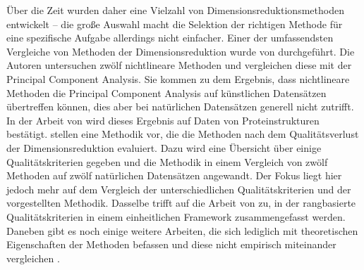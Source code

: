 Über die Zeit wurden daher eine Vielzahl von Dimensionsreduktionsmethoden entwickelt \parencite[siehe z.B.][]{Lee.2007} -- die große Auswahl macht die Selektion der richtigen Methode für
eine spezifische Aufgabe allerdings nicht einfacher. Einer der umfassendsten Vergleiche von
Methoden der Dimensionsreduktion wurde von \Textcite{vanderMaaten.2009} durchgeführt. Die Autoren
untersuchen zwölf nichtlineare Methoden und vergleichen diese mit der Principal Component Analysis.
Sie kommen zu dem Ergebnis, dass nichtlineare Methoden die Principal Component Analysis auf
künstlichen Datensätzen übertreffen können, dies aber bei natürlichen Datensätzen generell nicht
zutrifft. In der Arbeit von \textcite{RohanPandit.2016} wird dieses Ergebnis auf Daten von
Proteinstrukturen bestätigt. \Textcite{Gracia.2014} stellen eine Methodik vor, die die Methoden
nach dem Qualitätsverlust der Dimensionsreduktion evaluiert. Dazu wird eine Übersicht über einige
Qualitätskriterien gegeben und die Methodik in einem Vergleich von zwölf Methoden auf zwölf
natürlichen Datensätzen angewandt. Der Fokus liegt hier jedoch mehr auf dem Vergleich der
unterschiedlichen Qualitätskriterien und der vorgestellten Methodik. Dasselbe trifft auf die Arbeit
von \textcite{Lee.2009} zu, in der rangbasierte Qualitätskriterien in einem einheitlichen Framework
zusammengefasst werden. Daneben gibt es noch einige weitere Arbeiten, die sich lediglich mit
theoretischen Eigenschaften der Methoden befassen und diese nicht empirisch miteinander vergleichen \parencites{Cunningham.2014}{Sorzano.2014}{Lee.2007}{Sarveniazi.2014}{Burges.2009b}.

